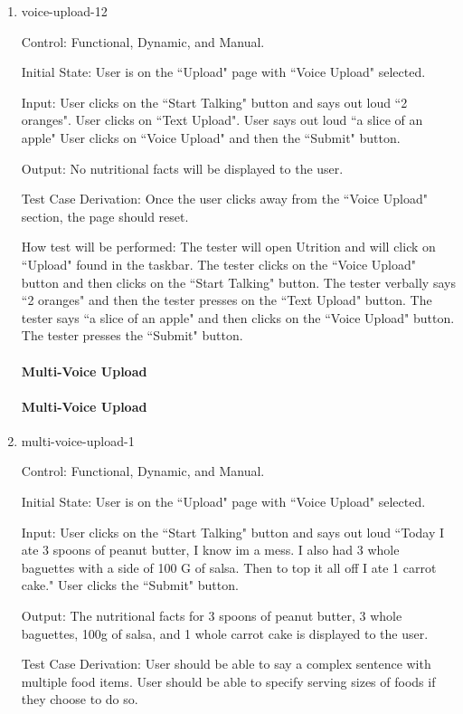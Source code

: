 \documentclass[12pt, titlepage]{article}
\begin{document}
\begin{enumerate}
	\item{voice-upload-12\\}
	
	Control: Functional, Dynamic, and Manual.
	
	Initial State: User is on the ``Upload" page with ``Voice Upload" selected.
	
	Input: User clicks on the ``Start Talking" button and says out loud ``2 oranges". User clicks on ``Text Upload". User says out loud ``a slice of an apple" User clicks on ``Voice Upload" and then the ``Submit" button.
	
	Output: No nutritional facts will be displayed to the user.
	
	Test Case Derivation: Once the user clicks away from the ``Voice Upload" section, the page should reset.
	
	How test will be performed: The tester will open Utrition and will click on ``Upload" found in the taskbar. The tester clicks on the ``Voice Upload" button and then clicks on the ``Start Talking" button. The tester verbally says ``2 oranges" and then the tester presses on the ``Text Upload" button. The tester says ``a slice of an apple" and then clicks on the ``Voice Upload" button. The tester presses the ``Submit" button.
		\paragraph{Multi-Voice Upload}
		\paragraph{Multi-Voice Upload}
	\item{multi-voice-upload-1\\}
	
	Control: Functional, Dynamic, and Manual.
	
	Initial State: User is on the ``Upload" page with ``Voice Upload" selected.
	
	Input: User clicks on the ``Start Talking" button and says out loud ``Today I ate 3 spoons of peanut butter, I know im a mess. I also had 3 whole baguettes with a side of 100 G of salsa. Then to top it all off I ate 1 carrot cake." User clicks the ``Submit" button.
	
	Output: The nutritional facts for 3 spoons of peanut butter, 3 whole baguettes, 100g of salsa, and 1 whole carrot cake is displayed to the user.
	
	Test Case Derivation: User should be able to say a complex sentence with multiple food items. User should be able to specify serving sizes of foods if they choose to do so.
	

\end{enumerate}
\end{document}
